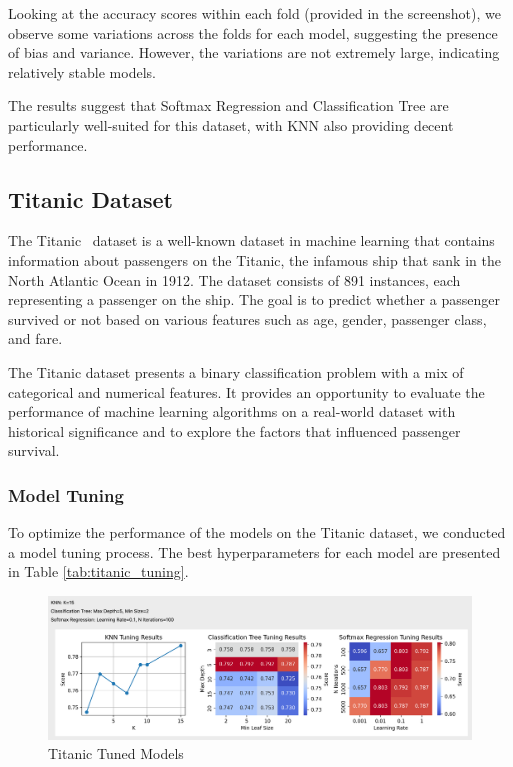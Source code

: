 \documentclass[letterpaper,10pt]{article}
\begin{document}
Looking at the accuracy scores within each fold (provided in the screenshot), we observe some variations across the folds for each model, suggesting the presence of bias and variance. However, the variations are not extremely large, indicating relatively stable models.\par


The results suggest that Softmax Regression and Classification Tree are particularly well-suited for this dataset, with KNN also providing decent performance.\par

\subsection{Titanic Dataset}

The Titanic~\cite{titanic} dataset is a well-known dataset in machine learning that contains information about passengers on the Titanic, the infamous ship that sank in the North Atlantic Ocean in 1912. The dataset consists of 891 instances, each representing a passenger on the ship. The goal is to predict whether a passenger survived or not based on various features such as age, gender, passenger class, and fare.

The Titanic dataset presents a binary classification problem with a mix of categorical and numerical features. It provides an opportunity to evaluate the performance of machine learning algorithms on a real-world dataset with historical significance and to explore the factors that influenced passenger survival.

\subsubsection{Model Tuning}

To optimize the performance of the models on the Titanic dataset, we conducted a model tuning process. The best hyperparameters for each model are presented in Table \ref{tab:titanic_tuning}.

\begin{figure}[ht]
    \centering
    \includegraphics[width=1.0\textwidth]{titanic_tuned.png}
    \caption{Titanic Tuned Models}
    \label{titanic_tuned}
\end{figure}
\end{document}
